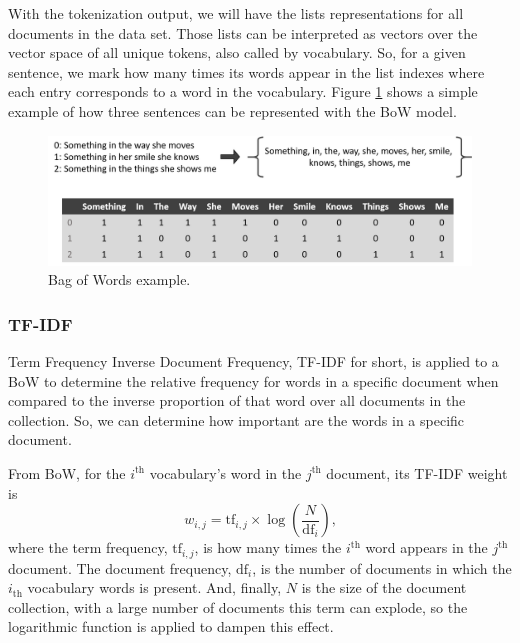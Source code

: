 	With the tokenization output, we will have the lists representations for all documents in the data set. Those lists can be interpreted as vectors over the vector space of all unique tokens, also called by vocabulary. So, for a given sentence, we mark how many times its words appear in the list indexes where each entry corresponds to a word in the vocabulary. Figure \ref{fig:bag-of-words} shows a simple example of how three sentences can be represented with the BoW model.

	\begin{figure}[h!]
		\centering
		\includegraphics[width=\linewidth]{01.Chapters/02.Background/bag-of-words}
		\caption{Bag of Words example.}
		\label{fig:bag-of-words}
	\end{figure}

	\subsubsection{TF-IDF}

	Term Frequency Inverse Document Frequency, TF-IDF for short, is applied to a BoW to determine the relative frequency for words in a specific document when compared to the inverse proportion of that word over all documents in the collection. So, we can determine how important are the words in a specific document.

	From BoW, for the $i^{\text{th}}$ vocabulary's word in the $j^{\text{th}}$ document, its TF-IDF weight is
	\begin{equation}
	\label{eq:tf-idf}
	w_{i, j} = \text{tf}_{i, j} \times \log\left(\dfrac{N}{\text{df}_{i}}\right) \text{,}
	\end{equation}
	where the term frequency, $\text{tf}_{i, j}$, is how many times the $i^{\text{th}}$ word appears in the $j^{\text{th}}$ document. The document frequency, $\text{df}_{i}$, is the number of documents in which the $i_{\text{th}}$ vocabulary words is present. And, finally, $N$ is the size of the document collection, with a large number of documents this term can explode, so the logarithmic function is applied to dampen this effect.

